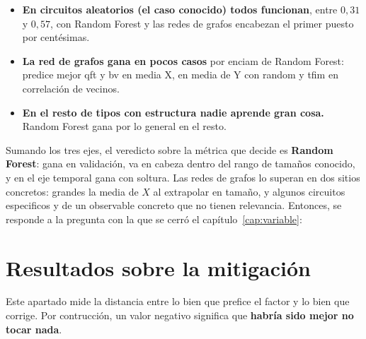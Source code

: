 \begin{itemize}
    \item \textbf{En circuitos aleatorios (el caso conocido) todos funcionan}, entre
          $0{,}31$ y $0{,}57$, con Random Forest y las redes de grafos encabezan el primer puesto por
          centésimas.
    \item \textbf{La red de grafos gana en pocos casos} por enciam de Random Forest: predice mejor qft y bv en media X, en media de Y con random y tfim en correlación de vecinos.
    \item \textbf{En el resto de tipos con estructura nadie aprende gran cosa.} Random Forest gana por lo general en el resto. 
\end{itemize}

Sumando los tres ejes, el veredicto sobre la métrica que decide es \textbf{Random Forest}: gana
en validación, va en cabeza dentro del rango de tamaños conocido, y en el eje temporal gana con soltura. Las redes de grafos lo superan en dos sitios concretos:
grandes la media de $X$ al extrapolar en tamaño, y algunos circuitos especificos y de un observable concreto que no tienen relevancia. Entonces, se responde a la pregunta con la que se cerró el capítulo~\ref{cap:variable}:

\begin{center}
\end{center}


\section{Resultados sobre la mitigación}
\label{sec:res_mitigacion}

Este apartado mide la
distancia entre lo bien que prefice el factor y lo bien que corrige.
Por contrucción, un valor negativo significa que \textbf{habría sido mejor no tocar nada}.

